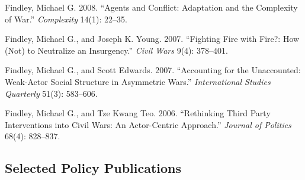 \documentclass[10pt]{article}
\begin{document}
\begin{etaremune}
\item Findley, Michael G. 2008. ``Agents and Conflict: Adaptation and the Complexity of War.'' \textit{Complexity} 14(1): 22--35. 


\item Findley, Michael G., and Joseph K. Young. 2007. ``Fighting Fire with Fire?: How (Not) to Neutralize an Insurgency.'' \textit{Civil Wars} 9(4): 378--401. 

\item Findley, Michael G., and Scott Edwards. 2007. ``Accounting for the Unaccounted: Weak-Actor Social Structure in Asymmetric Wars.'' \textit{International Studies Quarterly} 51(3): 583--606. 



\item Findley, Michael G., and Tze Kwang Teo. 2006. ``Rethinking Third Party Interventions into Civil Wars: An Actor-Centric Approach.'' \textit{Journal of Politics} 68(4): 828--837. 


\end{etaremune}



\subsection*{Selected Policy Publications}    %
\end{document}
